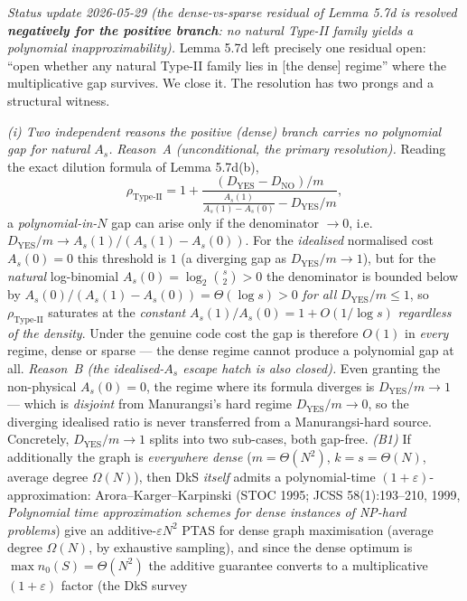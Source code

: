 \documentclass[
]{article}
\begin{document}
\emph{Status update 2026-05-29 (the dense-vs-sparse residual of
Lemma 5.7d is resolved \textbf{negatively for the positive branch}: no
natural Type-II family yields a polynomial inapproximability).} Lemma 5.7d
left precisely one residual open: ``open whether any natural Type-II family
lies in [the dense] regime'' where the multiplicative gap survives. We close
it. The resolution has two prongs and a structural witness.

\emph{(i) Two independent reasons the positive (dense) branch carries no
polynomial gap for natural $A_s$.} \emph{Reason~A (unconditional, the primary
resolution).} Reading the exact dilution formula of Lemma 5.7d(b),
\[
\rho_{\mathrm{Type\text{-}II}}
= 1 + \frac{(D_{\mathrm{YES}} - D_{\mathrm{NO}})/m}
            {\frac{A_s(1)}{A_s(1) - A_s(0)} - D_{\mathrm{YES}}/m},
\]
a \emph{polynomial-in-$N$} gap can arise only if the denominator $\to 0$,
i.e.\ $D_{\mathrm{YES}}/m \to A_s(1)/(A_s(1) - A_s(0))$. For the
\emph{idealised} normalised cost $A_s(0) = 0$ this threshold is $1$ (a
diverging gap as $D_{\mathrm{YES}}/m \to 1$), but for the \emph{natural}
log-binomial $A_s(0) = \log_2\binom{s}{2} > 0$ the denominator is bounded
below by $A_s(0)/(A_s(1) - A_s(0)) = \Theta(\log s) > 0$ \emph{for all}
$D_{\mathrm{YES}}/m \le 1$, so $\rho_{\mathrm{Type\text{-}II}}$ saturates at
the \emph{constant} $A_s(1)/A_s(0) = 1 + O(1/\log s)$ \emph{regardless of the
density}. Under the genuine code cost the gap is therefore $O(1)$ in
\emph{every} regime, dense or sparse --- the dense regime cannot produce a
polynomial gap at all. \emph{Reason~B (the idealised-$A_s$ escape hatch is
also closed).} Even granting the non-physical $A_s(0) = 0$, the regime where
its formula diverges is $D_{\mathrm{YES}}/m \to 1$ --- which is
\emph{disjoint} from Manurangsi's hard regime $D_{\mathrm{YES}}/m \to 0$, so
the diverging idealised ratio is never transferred from a Manurangsi-hard
source. Concretely, $D_{\mathrm{YES}}/m \to 1$ splits into two sub-cases,
both gap-free. \emph{(B1)} If additionally the graph is \emph{everywhere
dense} ($m = \Theta(N^2)$, $k = s = \Theta(N)$, average degree $\Omega(N)$),
then DkS \emph{itself} admits a polynomial-time $(1+\varepsilon)$-
approximation: Arora--Karger--Karpinski (STOC 1995; JCSS 58(1):193--210,
1999, \emph{Polynomial time approximation schemes for dense instances of
NP-hard problems}) give an additive-$\varepsilon N^2$ PTAS for dense graph
maximisation (average degree $\Omega(N)$, by exhaustive sampling), and since
the dense optimum is $\max n_0(S) = \Theta(N^2)$ the additive guarantee
converts to a multiplicative $(1+\varepsilon)$ factor (the DkS survey
\end{document}
